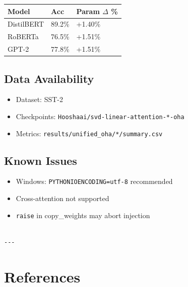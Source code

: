 \begin{table}[H]
\centering
\small
\begin{tabular}{lll}
\toprule
\textbf{Model} & \textbf{Acc} & \textbf{Param $\Delta$ \%} \\
\midrule
DistilBERT & 89.2\% & +1.40\% \\
RoBERTa & 76.5\% & +1.51\% \\
GPT-2 & 77.8\% & +1.51\% \\
\bottomrule
\end{tabular}
\end{table}

\subsection{Data Availability}

\begin{itemize}
\item Dataset: SST-2
\item Checkpoints: \texttt{Hooshaai/svd-linear-attention-*-oha}
\item Metrics: \texttt{results/unified\_oha/*/summary.csv}

\end{itemize}
\subsection{Known Issues}

\begin{itemize}
\item Windows: \texttt{PYTHONIOENCODING=utf-8} recommended
\item Cross-attention not supported
\item \texttt{raise} in copy\_weights may abort injection
\end{itemize}
\begin{lstlisting}

---
\end{lstlisting}


\section{References}

